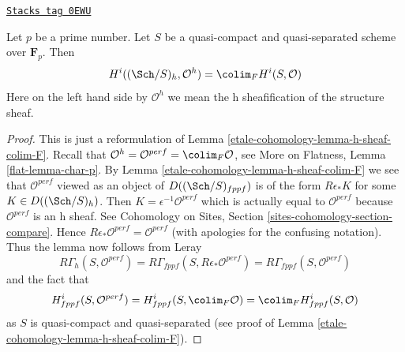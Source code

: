 \begin{proposition}
\label{etale-cohomology-proposition-h-cohomology-structure-sheaf}
\href{https://stacks.math.columbia.edu/tag/0EWU}{\texttt{Stacks tag 0EWU}}

Let $p$ be a prime number. Let $S$ be a quasi-compact and quasi-separated
scheme over $\mathbf{F}_p$. Then
$$
H^i((\Sch/S)_h, \mathcal{O}^h) =
\colim_F H^i(S, \mathcal{O})
$$
Here on the left hand side by $\mathcal{O}^h$ we mean
the h sheafification of the structure sheaf.
\end{proposition}

\begin{proof}
This is just a reformulation of Lemma \ref{etale-cohomology-lemma-h-sheaf-colim-F}.
Recall that
$\mathcal{O}^h = \mathcal{O}^{perf} = \colim_F \mathcal{O}$, see
More on Flatness, Lemma \ref{flat-lemma-char-p}.
By Lemma \ref{etale-cohomology-lemma-h-sheaf-colim-F} we see that
$\mathcal{O}^{perf}$ viewed as an object of $D((\Sch/S)_{fppf})$
is of the form $R\epsilon_*K$ for some $K \in D((\Sch/S)_h)$.
Then $K = \epsilon^{-1}\mathcal{O}^{perf}$ which is actually
equal to $\mathcal{O}^{perf}$ because $\mathcal{O}^{perf}$ is an h sheaf. See
Cohomology on Sites, Section \ref{sites-cohomology-section-compare}.
Hence $R\epsilon_*\mathcal{O}^{perf} = \mathcal{O}^{perf}$
(with apologies for the confusing notation).
Thus the lemma now follows from Leray
$$
R\Gamma_h(S, \mathcal{O}^{perf}) =
R\Gamma_{fppf}(S, R\epsilon_*\mathcal{O}^{perf}) =
R\Gamma_{fppf}(S, \mathcal{O}^{perf})
$$
and the fact that
$$
H^i_{fppf}(S, \mathcal{O}^{perf}) =
H^i_{fppf}(S, \colim_F \mathcal{O}) =
\colim_F H^i_{fppf}(S, \mathcal{O})
$$
as $S$ is quasi-compact and quasi-separated
(see proof of Lemma \ref{etale-cohomology-lemma-h-sheaf-colim-F}).
\end{proof}



